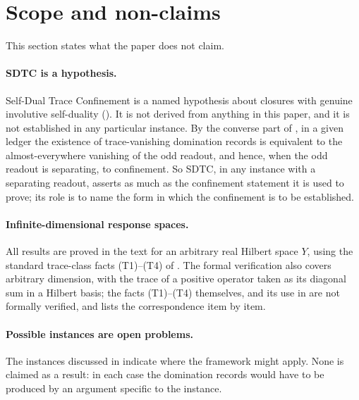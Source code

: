 \section{Scope and non-claims}
\label{sec:scope}

This section states what the paper does not claim.

\paragraph{SDTC is a hypothesis.}
Self-Dual Trace Confinement is a named hypothesis about closures with
genuine involutive self-duality ().  It is not
derived from anything in this paper, and it is not established in any
particular instance.  By the converse part of
, in a given ledger the
existence of trace-vanishing domination records is equivalent to the
almost-everywhere vanishing of the odd readout, and hence, when the
odd readout is separating, to confinement.  So SDTC, in any instance
with a separating readout, asserts as much as the confinement
statement it is used to prove; its role is to name the form in which the confinement is to be
established.

\paragraph{Infinite-dimensional response spaces.}
All results are proved in the text for an arbitrary real Hilbert space
\(Y\), using the standard trace-class facts (T1)--(T4) of
.  The formal verification also covers
arbitrary dimension, with the trace of a positive operator taken as its
diagonal sum in a Hilbert basis; the facts (T1)--(T4) themselves,
 and its use in
 are not formally verified, and
 lists the correspondence item by item.

\paragraph{Possible instances are open problems.}
The instances discussed in  indicate where the
framework might apply.  None is claimed as a result: in each case the
domination records would have to be produced by an argument specific
to the instance.

